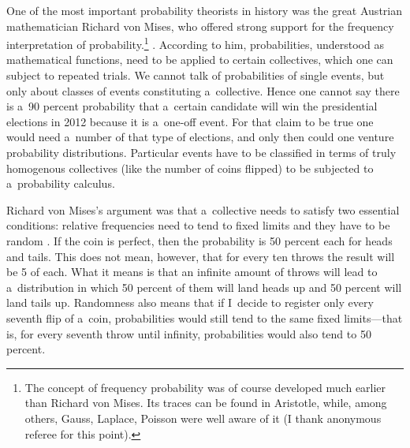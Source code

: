 One of the most important probability theorists in history was the great Austrian mathematician Richard von Mises, who offered strong support for the frequency interpretation of probability.\footnote{The concept of frequency probability was of course developed much earlier than Richard von Mises. Its traces can be found in Aristotle, while, among others, Gauss, Laplace, Poisson were well aware of it (I thank anonymous referee for this point).} 
\parencites[mainstream axiomatic foundations were built by][]{}[see][pp.17–18]{howson_theories_1995}. %
 According to him, probabilities, understood as mathematical functions, need to be applied to certain collectives, which one can subject to repeated trials. We cannot talk of probabilities of single events, but only about classes of events constituting a~collective. Hence one cannot say there is a~90 percent probability that a~certain candidate will win the presidential elections in 2012 because it is a~one-off event. For that claim to be true one would need a~number of that type of elections, and only then could one venture probability distributions. Particular events have to be classified in terms of truly homogenous collectives (like the number of coins flipped) to be subjected to a~probability calculus.



Richard von Mises's argument was that a~collective needs to satisfy two essential conditions: relative frequencies need to tend to fixed limits and they have to be random 
\parencite[][pp.28–29]{mises_probability_1957}. %
 If the coin is perfect, then the probability is 50 percent each for heads and tails. This does not mean, however, that for every ten throws the result will be 5 of each. What it means is that an infinite amount of throws will lead to a~distribution in which 50 percent of them will land heads up and 50 percent will land tails up. Randomness also means that if I~decide to register only every seventh flip of a~coin, probabilities would still tend to the same fixed limits---that is, for every seventh throw until infinity, probabilities would also tend to 50 percent.



